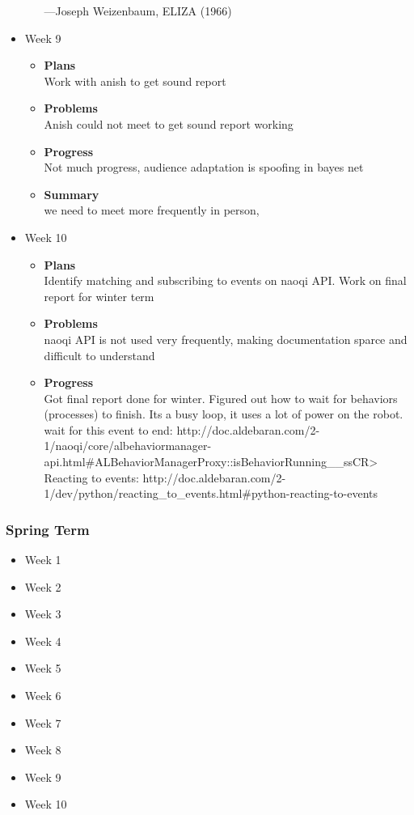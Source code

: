 \begin{itemize}
\begin{itemize}
				—Joseph Weizenbaum, ELIZA (1966) 

			\end{itemize}
		\item{Week 9}
			\begin{itemize}
				\item \textbf{Plans} \\
				Work with anish to get sound report
				\item \textbf{Problems} \\
				Anish could not meet to get sound report working
				\item \textbf{Progress} \\
				Not much progress, audience adaptation is spoofing in bayes net
				\item \textbf{Summary} \\
				we need to meet more frequently in person, 
			\end{itemize}
		\item{Week 10}
			\begin{itemize}
				\item \textbf{Plans} \\
				Identify matching and subscribing to events on naoqi API. Work on final report for winter term
				\item \textbf{Problems} \\
				naoqi API is not used very frequently, making documentation sparce and difficult to understand
				\item \textbf{Progress} \\
				Got final report done for winter.
				Figured out how to wait for behaviors (processes) to finish. Its a busy loop, it uses a lot of power on the robot.
					wait for this event to end: http://doc.aldebaran.com/2-1/naoqi/core/albehaviormanager-api.html#ALBehaviorManagerProxy::isBehaviorRunning__ssCR>  
				    Reacting to events: http://doc.aldebaran.com/2-1/dev/python/reacting_to_events.html#python-reacting-to-events 
			\end{itemize}
	\end{itemize}

	\subsubsection{Spring Term}
	\begin{itemize}
		\item{Week 1}
		\item{Week 2}
		\item{Week 3}
		\item{Week 4}
		\item{Week 5}
		\item{Week 6}
		\item{Week 7}
		\item{Week 8}
		\item{Week 9}
		\item{Week 10}
	\end{itemize}

